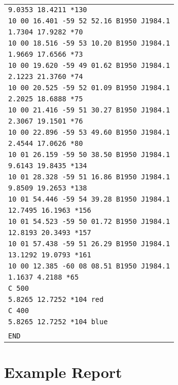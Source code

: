 \documentclass[twoside,11pt]{article}
\newcommand{\xlabel}[1]{}
\renewcommand{\_}{\texttt{\symbol{95}}}
\begin{document}
\begin{center}
\begin{scriptsize}
\begin{tabular}{|l|}
\verb|9.0353 18.4211 *130| \\
\verb|10 00 16.401 -59 52 52.16 B1950 J1984.1| \\
\verb|1.7304 17.9282 *70| \\
\verb|10 00 18.516 -59 53 10.20 B1950 J1984.1| \\
\verb|1.9669 17.6566 *73| \\
\verb|10 00 19.620 -59 49 01.62 B1950 J1984.1| \\
\verb|2.1223 21.3760 *74| \\
\verb|10 00 20.525 -59 52 01.09 B1950 J1984.1| \\
\verb|2.2025 18.6888 *75| \\
\verb|10 00 21.416 -59 51 30.27 B1950 J1984.1| \\
\verb|2.3067 19.1501 *76| \\
\verb|10 00 22.896 -59 53 49.60 B1950 J1984.1| \\
\verb|2.4544 17.0626 *80| \\
\verb|10 01 26.159 -59 50 38.50 B1950 J1984.1| \\
\verb|9.6143 19.8435 *134| \\
\verb|10 01 28.328 -59 51 16.86 B1950 J1984.1| \\
\verb|9.8509 19.2653 *138| \\
\verb|10 01 54.446 -59 54 39.28 B1950 J1984.1| \\
\verb|12.7495 16.1963 *156| \\
\verb|10 01 54.523 -59 50 01.72 B1950 J1984.1| \\
\verb|12.8193 20.3493 *157| \\
\verb|10 01 57.438 -59 51 26.29 B1950 J1984.1| \\
\verb|13.1292 19.0793 *161| \\
\verb|10 00 12.385 -60 08 08.51 B1950 J1984.1| \\
\verb|1.1637 4.2188 *65| \\
\verb|C 500| \\
\verb|5.8265 12.7252 *104 red| \\
\verb|C 400| \\
\verb|5.8265 12.7252 *104 blue| \\
\\
\verb|END| \\
\hline
\end{tabular}
\end{scriptsize}
\end{center}

\newpage
\section{\xlabel{example_report}Example Report}
\label{example_report}
\end{document}
